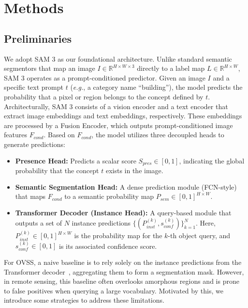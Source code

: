 \documentclass[twocolumn,switch,times]{article}
\begin{document}
\section{Methods}
\label{sec:methods}


\subsection{Preliminaries}

We adopt SAM 3 as our foundational architecture. Unlike standard semantic segmentors that map an image $I \in \mathbb{R}^{H \times W \times 3}$ directly to a label map $L \in \mathbb{R}^{H \times W}$, SAM 3 operates as a prompt-conditioned predictor. Given an image $I$ and a specific text prompt $t$ (\textit{e.g.}, a category name ``building''), the model predicts the probability that a pixel or region belongs to the concept defined by $t$.
Architecturally, SAM 3 consists of a vision encoder and a text encoder that extract image embeddings and text embeddings, respectively. These embeddings are processed by a Fusion Encoder, which outputs prompt-conditioned image features $F_{cond}$. Based on $F_{cond}$, the model utilizes three decoupled heads to generate predictions:

\begin{itemize}
    \item \textbf{Presence Head:} Predicts a scalar score $S_{pres} \in [0, 1]$, indicating the global probability that the concept $t$ exists in the image.
    \item \textbf{Semantic Segmentation Head:} A dense prediction module (FCN-style) that maps $F_{cond}$ to a semantic probability map $P_{sem} \in [0, 1]^{H \times W}$.
    \item \textbf{Transformer Decoder (Instance Head):} A query-based module that outputs a set of $N$ instance predictions $\{(P_{inst}^{(k)}, s_{conf}^{(k)})\}_{k=1}^N$. Here, $P_{inst}^{(k)} \in [0, 1]^{H \times W}$ is the probability map for the $k$-th object query, and $s_{conf}^{(k)} \in [0, 1]$ is its associated confidence score.
\end{itemize}

For OVSS, a naive baseline is to rely solely on the instance predictions from the Transformer decoder~\citep{carion2025sam}, aggregating them to form a segmentation mask. However, in remote sensing, this baseline often overlooks amorphous regions and is prone to false positives when querying a large vocabulary. Motivated by this, we introduce some strategies to address these limitations.
\end{document}
